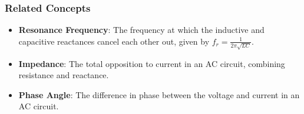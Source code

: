 \subsubsection*{Related Concepts}
\begin{itemize}
    \item \textbf{Resonance Frequency}: The frequency at which the inductive and capacitive reactances cancel each other out, given by \( f_r = \frac{1}{2\pi\sqrt{LC}} \).
    \item \textbf{Impedance}: The total opposition to current in an AC circuit, combining resistance and reactance.
    \item \textbf{Phase Angle}: The difference in phase between the voltage and current in an AC circuit.
\end{itemize}

